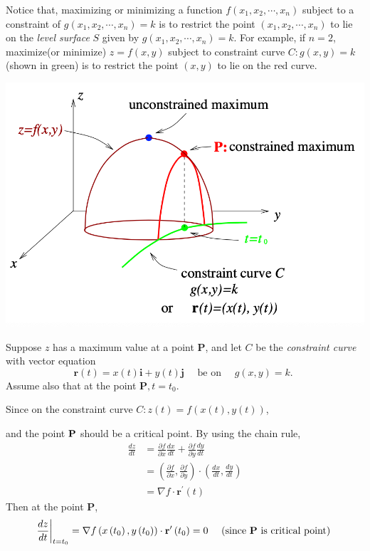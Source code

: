 \begin{spacing}{1.3}
    Notice that, maximizing or minimizing a function $f(x_1,x_2,\cdots,x_n)$
    subject to a constraint of $g(x_1,x_2,\cdots,x_n)=k$ is to restrict 
    the point $(x_1,x_2,\cdots,x_n)$ to lie on the {\it level surface} $S$
    given by $g(x_1,x_2,\cdots,x_n)=k$. For example, if $n=2$, 
    maximize(or minimize) $z=f(x,y)$ subject to constraint curve $C:g(x,y)=k$
    (shown in {\green green}) is to restrict the point $(x,y)$ to lie on the {\red red} curve.
    \begin{center}
        \includegraphics[scale=0.45]{images/Ch13-lag-proof.png}
    \end{center}
    Suppose $z$ has a maximum value at a point $\mathbf{P}$, and let $C$ be the {\it constraint curve} 
    with vector equation
    $$\mathbf{r}(t)=x(t) \mathbf{i}+y(t) \mathbf{j} \quad \text { be on } \quad g(x, y)=k \text {. }$$
    Assume also that at the point $\mathbf{P}, t=t_{0}$. 
    
    Since on the constraint curve $C: z(t)=f(x(t), y(t))$,

    and the point $\bf P$ should be a critical point. By using the chain rule,
    $$\begin{aligned}
    \frac{d z}{d t} &=\frac{\partial f}{\partial x} \frac{d x}{d t}+\frac{\partial f}{\partial y} \frac{d y}{d t} \\
    &=\left(\frac{\partial f}{\partial x}, \frac{\partial f}{\partial y}\right) \cdot\left(\frac{d x}{d t}, \frac{d y}{d t}\right) \\
    &=\nabla f \cdot \mathbf{r}^{\prime}(t)
    \end{aligned}$$
    Then at the point $\mathbf{P}$,
    $$\left.\frac{d z}{d t}\right|_{t=t_{0}}=\nabla f\left(x\left(t_{0}\right), y\left(t_{0}\right)\right) 
    \cdot \mathbf{r}^{\prime}\left(t_{0}\right)=0 \quad \text { (since {\bf P} is critical point) }$$


\end{spacing}
